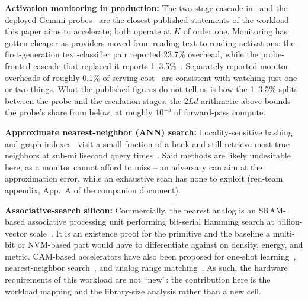\documentclass[conference]{IEEEtran}
\newcommand{\cam}{{CAM}\xspace}
\begin{document}
\textbf{Activation monitoring in production:} The two-stage cascade
in~\cite{ccpp2026,anthropic2026ccblog} and the deployed Gemini
probes~\cite{gemini2026probes} are the closest published statements of
the workload this paper aims to accelerate; both operate at $K$ of
order one.
Monitoring has gotten cheaper as providers moved from reading text to
reading activations: the first-generation text-classifier pair
reported 23.7\% overhead, while the probe-fronted cascade that
replaced it reports 1--3.5\%~\cite{cc2025,ccpp2026}. Separately
reported monitor overheads of roughly 0.1\% of serving
cost~\cite{anthropic2025cheapmonitors} are consistent with watching
just one or two things. What the published figures do not tell us is
how the 1--3.5\% splits between the probe and the escalation stages;
the $2Ld$ arithmetic above bounds the probe's share from below, at
roughly $10^{-5}$ of forward-pass compute.

\textbf{Approximate nearest-neighbor (ANN) search:}
Locality-sensitive
hashing~\cite{indyk1998lsh,charikar2002simhash} and graph
indexes~\cite{malkov2020hnsw} visit a small fraction of a bank and
still retrieve most true neighbors at sub-millisecond query
times~\cite{faisscuvs2025}. Said methods are likely undesirable
here, as a monitor cannot afford to miss -- an adversary can aim at
the approximation error, while an exhaustive scan has none to
exploit (red-team appendix, App.~A of the companion
document).

\textbf{Associative-search silicon:} Commercially, the nearest analog is
an SRAM-based associative processing unit performing bit-serial Hamming
search at billion-vector scale~\cite{gsi2025apu}. It is an existence
proof for the primitive and the baseline a multi-bit or NVM-based part
would have to differentiate against on density, energy, and metric.
\cam-based accelerators have also been proposed for one-shot
learning~\cite{ni2019fetcam}, nearest-neighbor
search~\cite{kazemi2021fefetcam}, and analog range
matching~\cite{li2020acam}. As such, the hardware requirements of
this workload are not ``new'': the contribution here is the workload
mapping and the library-size analysis rather than a new cell.

\end{document}
